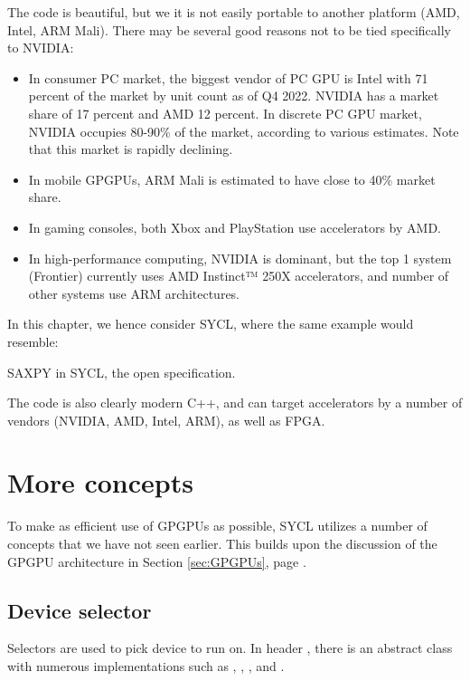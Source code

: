 The code is beautiful, but we it is not easily portable to another platform (AMD, Intel, ARM Mali). There may be several good reasons not to be tied specifically to NVIDIA:
\begin{itemize}
\item In consumer PC market, the biggest vendor of PC GPU is Intel with 71 percent of the market by unit count as of Q4 2022. NVIDIA has a market share of 17 percent and AMD 12 percent. In discrete PC GPU market, NVIDIA occupies 80-90\% of the market, according to various estimates. 
Note that this market is rapidly declining.
\item In mobile GPGPUs, ARM Mali is estimated to have close to 40\% market share.  
\item In gaming consoles, both Xbox and PlayStation use accelerators by AMD. 
\item In high-performance computing, NVIDIA is dominant, but the top 1 system (Frontier) currently uses AMD Instinct™ 250X accelerators, and number of other systems use ARM architectures. 
\end{itemize}

In this chapter, we hence consider SYCL, where the same example would resemble:

\raggedbottom
\begin{codebox}[]{}
\footnotesize SAXPY in SYCL, the open specification.
\tcblower
{}
\end{codebox}

The code is also clearly modern C++, and can target accelerators by a number of vendors (NVIDIA, AMD, Intel, ARM), as well as FPGA.

\section{More concepts}

To make as efficient use of GPGPUs as possible, SYCL utilizes a number of concepts that 
we have not seen earlier. This builds upon the discussion of the GPGPU architecture in Section \ref{sec:GPGPUs}, page \pageref{sec:GPGPUs}.

\subsection{Device selector}

Selectors are used to pick device to run on.
In header , there is an abstract class  with numerous implementations
such as , , , and .

